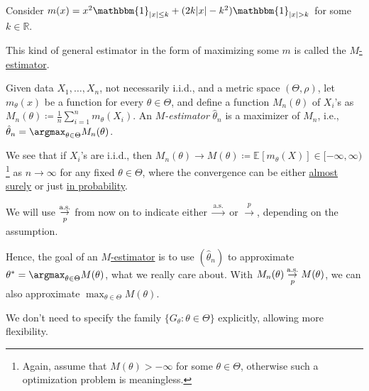 \begin{eg}
	Consider \(m(x) = x^2 \mathbbm{1}_{\lvert x \rvert \leq k} + (2k\lvert x \rvert - k^2) \mathbbm{1}_{\lvert x \rvert > k} \) for some \(k \in \mathbb{R} \).
\end{eg}

This kind of general estimator in the form of maximizing some \(m\) is called the \hyperref[def:M-estimator]{\(M\)-estimator}.

\begin{definition}[\(M\)-estimator]\label{def:M-estimator}
	Given data \(X_1, \dots , X_n \), not necessarily i.i.d., and a metric space \((\Theta , \rho )\), let \(m_\theta (x)\) be a function for every \(\theta \in \Theta \), and define a function \(M_n(\theta )\) of \(X_i\)'s as \(M_n (\theta ) \coloneqq \frac{1}{n} \sum_{i=1}^{n} m_\theta (X_i)\). An \emph{\(M\)-estimator} \(\hat{\theta} _n\) is a maximizer of \(M_n\), i.e., \(\hat{\theta} _n = \argmax_{\theta \in \Theta } M_n(\theta )\).
\end{definition}

We see that if \(X_i\)'s are i.i.d., then \(M_n(\theta ) \to M(\theta ) \coloneqq \mathbb{E}_{}[m_\theta (X)] \in [-\infty , \infty )\)\footnote{Again, assume that \(M(\theta ) > -\infty \) for some \(\theta  \in \Theta \), otherwise such a optimization problem is meaningless.} as \(n \to \infty \) for any fixed \(\theta \in \Theta \), where the convergence can be either \hyperref[def:converge-almost-surely]{almost surely} or just \hyperref[def:converge-in-probability]{in probability}.

\begin{notation}
	We will use \(\overunderset{\text{a.s.}}{p}{\to } \) from now on to indicate either \(\overset{\text{a.s.} }{\to} \) or \(\overset{p}{\to} \), depending on the assumption.
\end{notation}

Hence, the goal of an \hyperref[def:M-estimator]{\(M\)-estimator} is to use \((\hat{\theta} _n)\) to approximate \(\theta ^{\ast} = \argmax_{\theta \in \Theta } M(\theta )\), what we really care about. With \(M_n(\theta ) \overunderset{\text{a.s.}}{p}{\to } M(\theta )\), we can also approximate \(\max_{\theta \in \Theta } M(\theta )\).

\begin{intuition}
	We don't need to specify the family \(\{ G_\theta \colon \theta \in \Theta  \} \) explicitly, allowing more flexibility.
\end{intuition}

